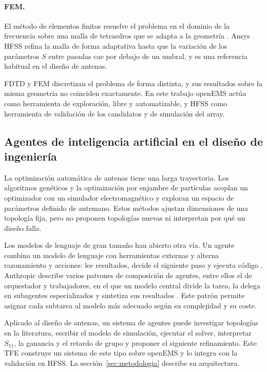 \documentclass[11pt,a4paper]{article}
\begin{document}
\paragraph{FEM.} El método de elementos finitos resuelve el problema en el dominio de la
frecuencia sobre una malla de tetraedros que se adapta a la geometría \cite{jin2014fem}. Ansys
HFSS refina la malla de forma adaptativa hasta que la variación de los parámetros $S$ entre pasadas
cae por debajo de un umbral, y es una referencia habitual en el diseño de antenas.

FDTD y FEM discretizan el problema de forma distinta, y sus resultados sobre la misma geometría no
coinciden exactamente. En este trabajo openEMS actúa como herramienta de exploración, libre y
automatizable, y HFSS como herramienta de validación de los candidatos y de simulación del array.

\subsection{Agentes de inteligencia artificial en el diseño de ingeniería}\label{sec:agentes}
La optimización automática de antenas tiene una larga trayectoria. Los algoritmos genéticos
\cite{haupt1995genetic} y la optimización por enjambre de partículas \cite{robinson2004pso}
acoplan un optimizador con un simulador electromagnético y exploran un espacio de parámetros
definido de antemano. Estos métodos ajustan dimensiones de una topología fija, pero no proponen
topologías nuevas ni interpretan por qué un diseño falla.

Los modelos de lenguaje de gran tamaño han abierto otra vía. Un agente combina un modelo de
lenguaje con herramientas externas y alterna razonamiento y acciones: lee resultados, decide el
siguiente paso y ejecuta código \cite{yao2023react}. Anthropic describe varios patrones de
composición de agentes, entre ellos el de orquestador y trabajadores, en el que un modelo central
divide la tarea, la delega en subagentes especializados y sintetiza sus resultados
\cite{anthropic2024agents}. Este patrón permite asignar cada subtarea al modelo más adecuado según
su complejidad y su coste.

Aplicado al diseño de antenas, un sistema de agentes puede investigar topologías en la
literatura, escribir el modelo de simulación, ejecutar el solver, interpretar $S_{11}$, la
ganancia y el retardo de grupo y proponer el siguiente refinamiento. Este TFE construye un sistema
de este tipo sobre openEMS y lo integra con la validación en HFSS. La sección~\ref{sec:metodologia}
describe su arquitectura.
\end{document}
